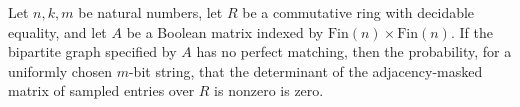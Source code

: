\begin{theorem}
\label{Randomized.Matching.randProb_lovasz_eq_zero}
\leanok
{}
Let $n,k,m$ be natural numbers, let $R$ be a commutative ring with decidable equality,
and let $A$ be a Boolean matrix indexed by $\text{Fin}(n)\times\text{Fin}(n)$. If the
bipartite graph specified by $A$ has no perfect matching, then the probability, for a
uniformly chosen $m$-bit string, that the determinant of the adjacency-masked matrix of
sampled entries over $R$ is nonzero is zero.
\end{theorem}

